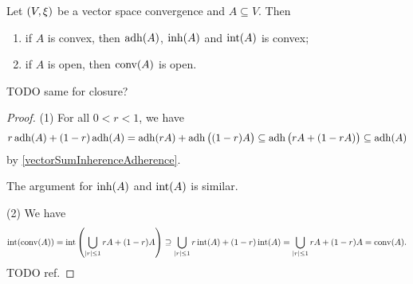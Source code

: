 \begin{proposition} \label{inherenceAdherenceConvex}
Let $\left( V,\xi \right)$ be a vector space convergence and $A\subseteq V$. Then
\begin{enumerate}
\item if $A$ is convex, then $\operatorname{adh}(A)$, $\operatorname{inh}(A)$ and $\operatorname{int}(A)$ is convex;
\item if $A$ is open, then $\operatorname{conv}(A)$ is open.
\end{enumerate}
\end{proposition}
TODO same for closure?
\begin{proof}
(1) For all $0<r<1$, we have
\[ r\operatorname{adh}(A) + (1-r)\operatorname{adh}(A) = \operatorname{adh}(rA) + \operatorname{adh}\big((1-r)A\big) \subseteq \operatorname{adh}\big(rA + (1-rA)\big) \subseteq \operatorname{adh}(A) \]
by \ref{vectorSumInherenceAdherence}. 

The argument for $\operatorname{inh}(A)$ and $\operatorname{int}(A)$ is similar.

(2) We have
\[ \operatorname{int}(\operatorname{conv}(A)) = \operatorname{int}\left(\bigcup_{|r|\leq 1} rA + (1-r)A\right) \supseteq \bigcup_{|r|\leq 1} r\operatorname{int}(A) + (1-r)\operatorname{int}(A) = \bigcup_{|r|\leq 1} rA + (1-r)A = \operatorname{conv}(A). \]
TODO ref.
\end{proof}

